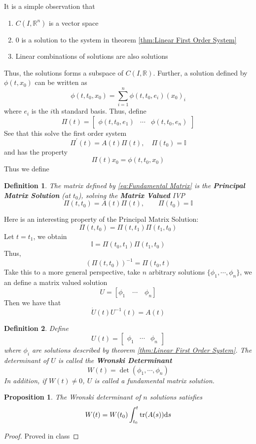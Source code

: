 \documentclass[a4paper, 12pt]{book}
\newtheorem{definition}{Definition}[chapter]
\newtheorem{proposition}{Proposition}[chapter]
\begin{document}
It is a simple observation that
\begin{enumerate}
	\item \( C(I,\mathbb{R}^n)\) is a vector space
	\item \( 0 \) is a solution to the system in theorem \ref{thm:Linear First Order System}
	\item Linear combinations of solutions are also solutions
\end{enumerate}
Thus, the solutions forms a subspace of \( C(I,\mathbb{R}) \). Further, a solution defined by \( \phi(t,x_0) \) can be written as \[
	\phi(t, t_0 ,x_0)=\sum_{i=1}^{n} \phi(t,t_0,e_i) (x_0)_i
\]
where \( e_i \) is the \( i \)th standard basis. Thus, define
\begin{equation}
	\Pi(t)=
	\begin{bmatrix}
		\phi(t,t_0, e_1) & \cdots & \phi(t,t_0, e_n)
	\end{bmatrix}
	\label{eq:Fundamental Matrix}
\end{equation}
See that this solve the first order system \[
	\Pi^\prime(t)=A(t)\Pi(t), \quad \Pi(t_0)=\mathbb{I}
\]
and has the property \[
	\Pi(t)x_0=\phi(t,t_0,x_0)
\]
Thus we define
\begin{definition}
	The matrix defined by \eqref{eq:Fundamental Matrix} is the \textbf{Principal Matrix Solution} (at \( t_0 \)), solving the \textbf{Matrix Valued} IVP \[
		\Pi(t,t_0)=A(t)\Pi(t), \qquad \Pi(t_0)=\mathbb{I}
	\]
\end{definition}
Here is an interesting property of the Principal Matrix Solution:\[
	\Pi(t,t_0)=\Pi(t,t_1)\Pi(t_1,t_0)
\]
Let \( t=t_1 \), we obtain
\[
	\mathbb{I}=\Pi(t_0,t_1)\Pi(t_1,t_0)
\]
Thus,
\[
	(\Pi(t,t_0))^{-1} =\Pi(t_0,t)
\]
Take this to a more general perspective, take \( n \) arbitrary solutions \( \{ \phi_1, \cdots, \phi_n \}\),
we an define a matrix valued solution \[
	U=[\phi_1 \quad \cdots \quad \phi_n ]
\]
Then we have that \[
	\dot{U}(t)U^{-1}(t) =A(t)
\]
\begin{definition}
	Define \[
		U(t)=
		\begin{bmatrix}
			\phi_1 & \cdots & \phi_n
		\end{bmatrix}
	\]
	where \( \phi_i \) are solutions described by theorem \ref{thm:Linear First Order System}. The determinant of \( U \) is called the \textbf{Wronski Determinant}
	\begin{equation*}
		W(t)=\det(\phi_1, \cdots, \phi_n)
	\end{equation*}
	In addition, if \( W(t)\neq 0 \), \( U \) is called a fundamental matrix solution.
\end{definition}
\begin{proposition}
	The Wronski determinant of \( n \) solutions satisfies
	\begin{equation*}
		W(t)=W(t_0)\int_{t_0}^{t} \tr(A(s))\mathrm{d}s
	\end{equation*}
\end{proposition}
\begin{proof}
	Proved in class
\end{proof}
\end{document}
